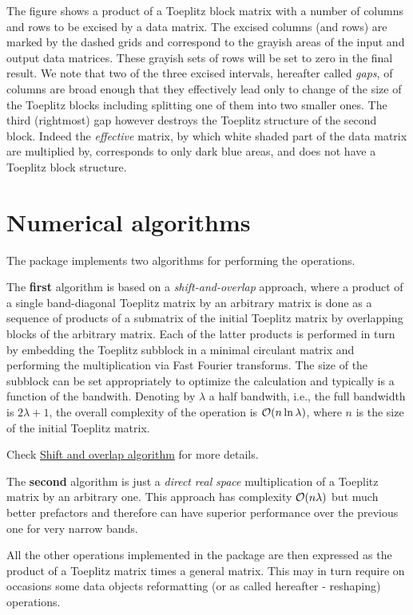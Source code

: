 The figure shows a product of a Toeplitz block matrix with a number of columns and rows to be excised by a data matrix. The excised columns (and rows) are marked by the dashed grids and correspond to the grayish areas of the input and output data matrices. These grayish sets of rows will be set to zero in the final result. We note that two of the three excised intervals, hereafter called {\itshape gaps}, of columns are broad enough that they effectively lead only to change of the size of the Toeplitz blocks including splitting one of them into two smaller ones. The third (rightmost) gap however destroys the Toeplitz structure of the second block. Indeed the {\itshape effective} matrix, by which white shaded part of the data matrix are multiplied by, corresponds to only dark blue areas, and does not have a Toeplitz block structure. \section{Numerical algorithms}\label{toeplitz_algo}
The package implements two algorithms for performing the operations.

The {\bfseries first} algorithm is based on a {\itshape shift-\/and-\/overlap} approach, where a product of a single band-\/diagonal Toeplitz matrix by an arbitrary matrix is done as a sequence of products of a submatrix of the initial Toeplitz matrix by overlapping blocks of the arbitrary matrix. Each of the latter products is performed in turn by embedding the Toeplitz subblock in a minimal circulant matrix and performing the multiplication via Fast Fourier transforms. The size of the subblock can be set appropriately to optimize the calculation and typically is a function of the bandwith. Denoting by $ \lambda$ a half bandwith, i.\-e., the full bandwidth is $ 2 \lambda + 1 $, the overall complexity of the operation is ${\cal O}( n \ln \lambda)$, where $ n $ is the size of the initial Toeplitz matrix.

Check \hyperlink{toeplitz_algo_shiftoverlap}{Shift and overlap algorithm} for more details.

The {\bfseries second} algorithm is just a {\itshape direct} {\itshape real} {\itshape space} multiplication of a Toeplitz matrix by an arbitrary one. This approach has complexity $ {\cal O}( n \lambda)$ but much better prefactors and therefore can have superior performance over the previous one for very narrow bands.

All the other operations implemented in the package are then expressed as the product of a Toeplitz matrix times a general matrix. This may in turn require on occasions some data objects reformatting (or as called hereafter -\/ reshaping) operations.

